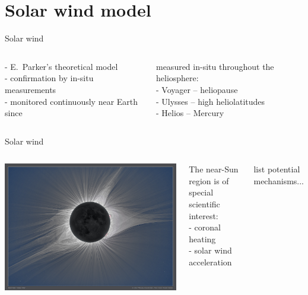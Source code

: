 \section{Solar wind model}

\begin{frame}[c]{Solar wind}{}
	\begin{columns}[c]
		
		- E.~Parker's theoretical model\\
		- confirmation by in-situ measurements\\
		- monitored continuously near Earth since
		
		
		measured in-situ throughout the heliosphere:\\
		- Voyager -- heliopause\\
		- Ulysses -- high heliolatitudes\\
		- Helios -- Mercury
		
	\end{columns}
\end{frame}
\begin{frame}[c]{Solar wind}{}
	\begin{columns}[c]
		
		\includegraphics[width=\textwidth]{../figures_of_others/images/Tse_2017_mi800.jpg}
		
		
		The near-Sun region is of special scientific interest:\\
		- coronal heating\\
		- solar wind acceleration\\\ 
		
		list potential mechanisms...
		
	\end{columns}
\end{frame}
